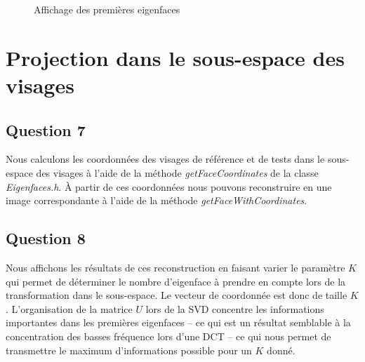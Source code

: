 \documentclass[a4paper]{article}
\begin{document}
\begin{figure}
  \hspace{0.01\textwidth}
  \hspace{0.01\textwidth}
  \hspace{0.01\textwidth}
  \caption{Affichage des premières eigenfaces}
  \label{q6}
\end{figure}

\section{Projection dans le sous-espace des visages}

\subsection{Question 7}

Nous calculons les coordonnées des visages de référence et de tests dans le sous-espace des visages à l'aide
de la méthode {\em getFaceCoordinates} de la classe {\em Eigenfaces.h}.
À partir de ces coordonnées nous pouvons reconstruire en une image correspondante à l'aide de la méthode 
{\em getFaceWithCoordinates}.

\subsection{Question 8}

Nous affichons les résultats de ces reconstruction en faisant varier le paramètre $K$ qui permet de déterminer
le nombre d'eigenface à prendre en compte lors de la transformation dans le sous-espace.
Le vecteur de coordonnée est donc de taille $K$. L'organisation de la matrice $U$ lors de la SVD concentre les
informations importantes dans les premières eigenfaces 
-- ce qui est un résultat semblable à la concentration des basses fréquence lors d'une DCT -- 
ce qui nous permet de transmettre le maximum d'informations possible pour un $K$ donné.
\end{document}
